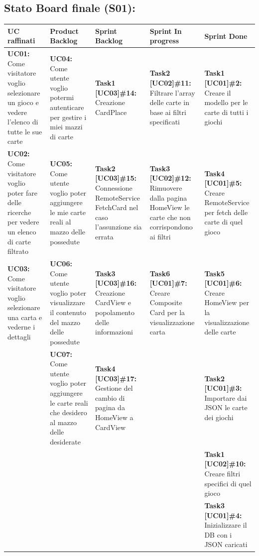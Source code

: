 \documentclass[a4paper, oneside]{article}
\begin{document}
\begin{landscape}
        \subsection{Stato Board finale (S01):}
        \small
        \def\arraystretch{2}%
        \begin{tabular}{ | p{5cm} | p{3cm} | p{5cm} | p{5cm} | p{5cm}| }
            \hline
            \textbf{UC raffinati}
            & \textbf{Product Backlog}
            & \textbf{Sprint Backlog}
            & \textbf{Sprint In progress}
            & \textbf{Sprint Done} \\
            \hline
            \textbf{UC01:} Come visitatore voglio selezionare un gioco e vedere l'elenco di tutte le sue carte
            & \textbf{UC04:}  Come utente voglio potermi autenticare per gestire i miei mazzi di carte & \textbf{Task1 [UC03]\#14:} Creazione CardPlace
            & \textbf{Task2 [UC02]\#11:} Filtrare l'array delle carte in base ai filtri specificati
            & \textbf{Task1 [UC01]\#2:} Creare il modello per le carte di tutti i giochi \\
            \hline
            \textbf{UC02:} Come visitatore voglio poter fare delle ricerche per vedere un elenco di carte filtrato
            & \textbf{UC05:}  Come utente voglio poter aggiungere le mie carte reali al mazzo delle possedute & \textbf{Task2 [UC03]\#15:} Connessione RemoteService FetchCard nel caso l'assunzione sia errata
            & \textbf{Task3 [UC02]\#12:} Rimuovere dalla pagina HomeView le carte che non corrispondono ai filtri
            & \textbf{Task4 [UC01]\#5:} Creare RemoteService per fetch delle carte di quel gioco \\
            \hline
            \textbf{UC03:} Come visitatore voglio selezionare una carta e vederne i dettagli
            & \textbf{UC06:} Come utente voglio poter visualizzare il contenuto del mazzo delle possedute & \textbf{Task3 [UC03]\#16:} Creazione CardView e popolamento delle informazioni
            & \textbf{Task6 [UC01]\#7:} Creare Composite Card per la visualizzazione carta
            & \textbf{Task5 [UC01]\#6:} Creare HomeView per la visualizzazione delle carte \\
            \hline
            & \textbf{UC07:} Come utente voglio poter aggiungere le carte reali che desidero al mazzo delle desiderate  & \textbf{Task4 [UC03]\#17:} Gestione del cambio di pagina da HomeView a CardView
            & & \textbf{Task2 [UC01]\#3:} Importare dai JSON le carte dei giochi \\
            \hline
            & & & & \textbf{Task1 [UC02]\#10:} Creare filtri specifici di quel gioco  \\
            \hline
            & & & & \textbf{Task3 [UC01]\#4:} Inizializzare il DB con i JSON caricati \\
            \hline
        \end{tabular}


\end{landscape}
\end{document}
